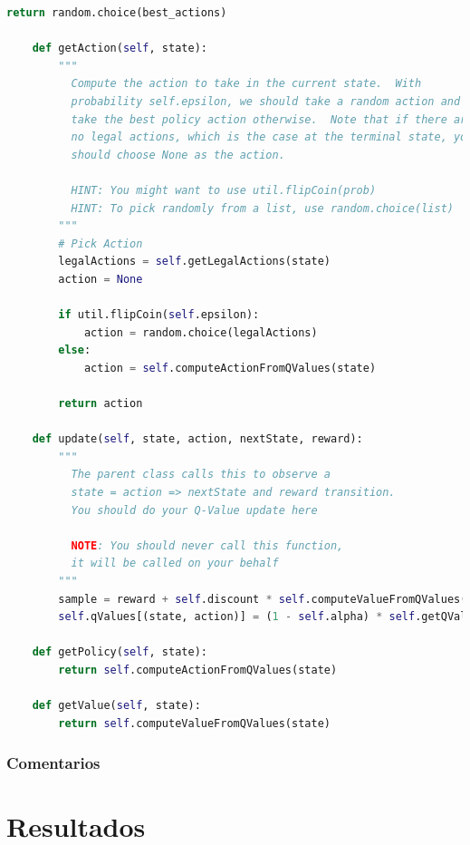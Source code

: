 \documentclass{report}
\begin{document}
\begin{lstlisting}[language=Python, caption=Q-Learning]
        return random.choice(best_actions)

    def getAction(self, state):
        """
          Compute the action to take in the current state.  With
          probability self.epsilon, we should take a random action and
          take the best policy action otherwise.  Note that if there are
          no legal actions, which is the case at the terminal state, you
          should choose None as the action.

          HINT: You might want to use util.flipCoin(prob)
          HINT: To pick randomly from a list, use random.choice(list)
        """
        # Pick Action
        legalActions = self.getLegalActions(state)
        action = None
        
        if util.flipCoin(self.epsilon):
            action = random.choice(legalActions)
        else:
            action = self.computeActionFromQValues(state)

        return action

    def update(self, state, action, nextState, reward):
        """
          The parent class calls this to observe a
          state = action => nextState and reward transition.
          You should do your Q-Value update here

          NOTE: You should never call this function,
          it will be called on your behalf
        """
        sample = reward + self.discount * self.computeValueFromQValues(nextState)
        self.qValues[(state, action)] = (1 - self.alpha) * self.getQValue(state, action) + self.alpha * sample

    def getPolicy(self, state):
        return self.computeActionFromQValues(state)

    def getValue(self, state):
        return self.computeValueFromQValues(state)

\end{lstlisting}
      \subsection*{Comentarios}
        \paragraph*{}{
          
        }
  \chapter{Resultados}
\end{document}

